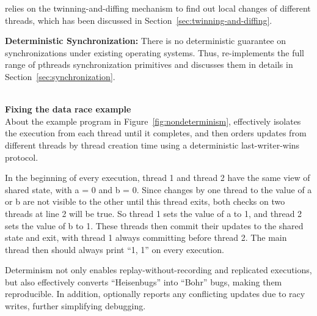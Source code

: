 \dthreads{} relies on the twinning-and-diffing mechanism to find out local changes of different threads, which has been discussed in Section~\ref{sec:twinning-and-diffing}. 

\textbf{Deterministic Synchronization:}
There is no deterministic guarantee on synchronizations under existing operating systems. Thus, \dthreads{} re-implements the full range of pthreads synchronization primitives and discusses  them in details in Section~\ref{sec:synchronization}. 

\hspace{1em} \\
\noindent
\textbf{Fixing the data race example} \\
About the example program in Figure~\ref{fig:nondeterminism},  \dthreads{} effectively isolates the execution from each thread until it completes, and then orders updates from different threads by thread creation time using a deterministic last-writer-wins protocol.

In the beginning of every execution, thread 1 and thread 2 have the same view of shared state, with a = 0 and b = 0. Since changes by one thread to the value of a or b are not visible to the other until this thread exits, both checks on two threads at line 2 will be true. So thread 1 sets the value of a to 1, and thread 2 sets the value of b to 1. These threads then commit their updates to the shared state and exit, with thread 1 always committing before thread 2. The main thread then should always print ``1, 1'' on every execution.

Determinism not only enables replay-without-recording and replicated executions, but also effectively converts ``Heisenbugs'' into ``Bohr'' bugs, making them reproducible. In addition, \dthreads{} optionally reports any conflicting updates due to racy writes, further simplifying debugging.
